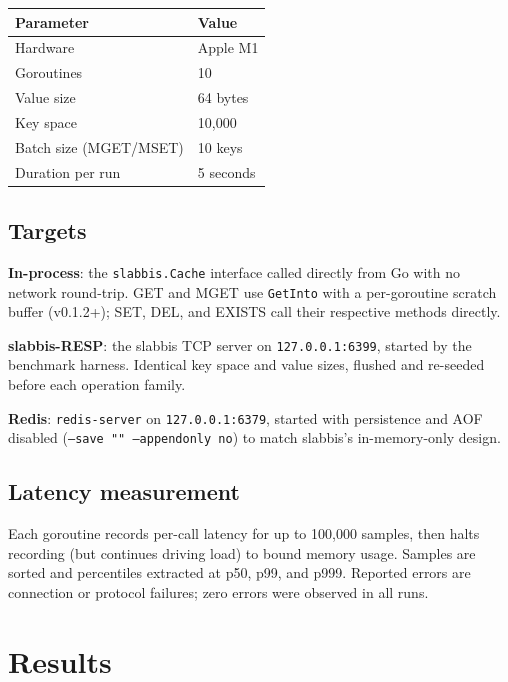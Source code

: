 \documentclass[a4paper,11pt]{article}
\begin{document}
\begin{center}
\begin{tabular}{ll}
\toprule
Parameter & Value \\
\midrule
Hardware       & Apple M1 \\
Goroutines     & 10 \\
Value size     & 64 bytes \\
Key space      & 10{,}000 \\
Batch size (MGET/MSET) & 10 keys \\
Duration per run & 5 seconds \\
\bottomrule
\end{tabular}
\end{center}

\subsection{Targets}

\textbf{In-process}: the \texttt{slabbis.Cache} interface called directly from
Go with no network round-trip. GET and MGET use \texttt{GetInto} with a
per-goroutine scratch buffer (v0.1.2+); SET, DEL, and EXISTS call their
respective methods directly.

\textbf{slabbis-RESP}: the slabbis TCP server on \texttt{127.0.0.1:6399},
started by the benchmark harness. Identical key space and value sizes, flushed
and re-seeded before each operation family.

\textbf{Redis}: \texttt{redis-server} on \texttt{127.0.0.1:6379}, started
with persistence and AOF disabled (\texttt{--save "" --appendonly no}) to
match slabbis's in-memory-only design.

\subsection{Latency measurement}

Each goroutine records per-call latency for up to 100{,}000 samples, then
halts recording (but continues driving load) to bound memory usage. Samples are
sorted and percentiles extracted at p50, p99, and p999. Reported errors are
connection or protocol failures; zero errors were observed in all runs.

\section{Results}
\end{document}
